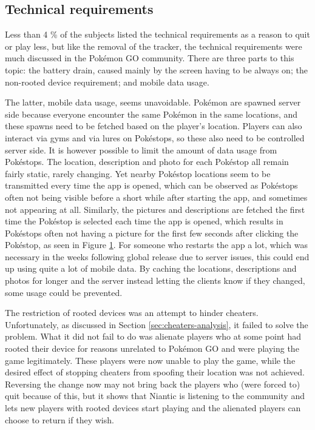 \subsection{Technical requirements}
\label{sec:quitting-reasons-technical-requirements}
Less than 4 \% of the subjects listed the technical requirements as a reason to quit or play less, but like the removal of the tracker, the technical requirements were much discussed in the Pokémon GO community. There are three parts to this topic: the battery drain, caused mainly by the screen having to be always on; the non-rooted device requirement; and mobile data usage.

The latter, mobile data usage, seems unavoidable. Pokémon are spawned server side because everyone encounter the same Pokémon in the same locations, and these spawns need to be fetched based on the player's location. Players can also interact via gyms and via lures on Pokéstops, so these also need to be controlled server side. It is however possible to limit the amount of data usage from Pokéstops. The location, description and photo for each Pokéstop all remain fairly static, rarely changing. Yet nearby Pokéstop locations seem to be transmitted every time the app is opened, which can be observed as Pokéstops often not being visible before a short while after starting the app, and sometimes not appearing at all. Similarly, the pictures and descriptions are fetched the first time the Pokéstop is selected each time the app is opened, which results in Pokéstops often not having a picture for the first few seconds after clicking the Pokéstop, as seen in Figure \ref{fig:blank-pokestop}. For someone who restarts the app a lot, which was necessary in the weeks following global release due to server issues, this could end up using quite a lot of mobile data. By caching the locations, descriptions and photos for longer and the server instead letting the clients know if they changed, some usage could be prevented.

\begin{figure}[h]
	\centering
	\caption{}
	\label{fig:blank-pokestop}
\end{figure}

The restriction of rooted devices was an attempt to hinder cheaters. Unfortunately, as discussed in Section \ref{sec:cheaters-analysis}, it failed to solve the problem. What it did not fail to do was alienate players who at some point had rooted their device for reasons unrelated to Pokémon GO and were playing the game legitimately. These players were now unable to play the game, while the desired effect of stopping cheaters from spoofing their location was not achieved. Reversing the change now may not bring back the players who (were forced to) quit because of this, but it shows that Niantic is listening to the community and lets new players with rooted devices start playing and the alienated players can choose to return if they wish.

